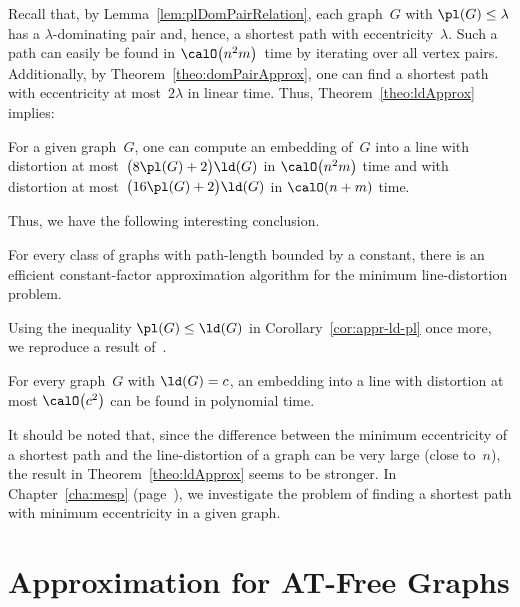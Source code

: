 Recall that, by Lemma~\ref{lem:plDomPairRelation}, each graph~$G$ with $\pl(G) \leq \lambda$ has a $\lambda$-dominating pair and, hence, a shortest path with eccentricity~$\lambda$.
Such a path can easily be found in \( \calO \! \left( n^2 m \right) \)~time by iterating over all vertex pairs.
Additionally, by Theorem~\ref{theo:domPairApprox}, one can find a shortest path with eccentricity at most~$2 \lambda$ in linear time.
Thus, Theorem~\ref{theo:ldApprox} implies:

\begin{corollary}
    \label{cor:appr-ld-pl}
For a given graph~\( G \), one can compute an embedding of~\( G \) into a line with distortion at most~\( \big( 8 \pl(G) + 2 \big) \ld(G) \) in \( \calO \! \left( n^2 m \right) \) time and with distortion at most~\( \big( 16 \pl(G) + 2 \big) \ld(G) \) in \( \calO(n + m) \) time.
\end{corollary}

Thus, we have the following interesting conclusion.

\begin{theorem}
    \label{theo:ld-pl}
For every class of graphs with path-length bounded by a constant, there is an efficient constant-factor approximation algorithm for the minimum line-distortion problem.
\end{theorem}

Using the inequality $\pl(G) \leq \ld(G)$ in Corollary~\ref{cor:appr-ld-pl} once more, we reproduce a result of~\cite{BadDhaGupRab2005}.

\begin{corollary}
For every graph~\( G \) with \( \ld(G) = c \), an embedding into a line with distortion at most \( \calO \! \left( c^2 \right) \) can be found in polynomial time.
\end{corollary}

It should be noted that, since the difference between the minimum eccentricity of a shortest path and the line-distortion of a graph can be very large (close to~$n$), the result in Theorem~\ref{theo:ldApprox} seems to be stronger.
In Chapter~\ref{cha:mesp} (page~\pageref{cha:mesp}), we investigate the problem of finding a shortest path with minimum eccentricity in a given graph.

\section{Approximation for AT-Free Graphs}
    \label{sec:appr-ld-AT}

